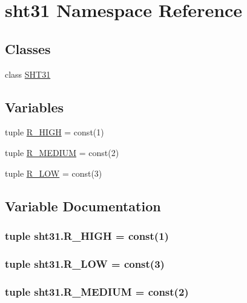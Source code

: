 \hypertarget{namespacesht31}{\section{sht31 Namespace Reference}
\label{namespacesht31}
}
\subsection*{Classes}
\begin{DoxyCompactItemize}
\item 
class \hyperlink{classsht31_1_1SHT31}{S\-H\-T31}
\end{DoxyCompactItemize}
\subsection*{Variables}
\begin{DoxyCompactItemize}
\item 
tuple \hyperlink{namespacesht31_a5f79cfb96d1107f4c885e4451a085307}{R\-\_\-\-H\-I\-G\-H} = const(1)
\item 
tuple \hyperlink{namespacesht31_a39ca7a0c9f2df3e08517f604b719b93e}{R\-\_\-\-M\-E\-D\-I\-U\-M} = const(2)
\item 
tuple \hyperlink{namespacesht31_a2cc4a4c81c072b041ac5a7fdf1a674c9}{R\-\_\-\-L\-O\-W} = const(3)
\end{DoxyCompactItemize}


\subsection{Variable Documentation}
\hypertarget{namespacesht31_a5f79cfb96d1107f4c885e4451a085307}{
\subsubsection[{R\-\_\-\-H\-I\-G\-H}]{\setlength{\rightskip}{0pt plus 5cm}tuple sht31.\-R\-\_\-\-H\-I\-G\-H = const(1)}}\label{namespacesht31_a5f79cfb96d1107f4c885e4451a085307}
\hypertarget{namespacesht31_a2cc4a4c81c072b041ac5a7fdf1a674c9}{
\subsubsection[{R\-\_\-\-L\-O\-W}]{\setlength{\rightskip}{0pt plus 5cm}tuple sht31.\-R\-\_\-\-L\-O\-W = const(3)}}\label{namespacesht31_a2cc4a4c81c072b041ac5a7fdf1a674c9}
\hypertarget{namespacesht31_a39ca7a0c9f2df3e08517f604b719b93e}{
\subsubsection[{R\-\_\-\-M\-E\-D\-I\-U\-M}]{\setlength{\rightskip}{0pt plus 5cm}tuple sht31.\-R\-\_\-\-M\-E\-D\-I\-U\-M = const(2)}}\label{namespacesht31_a39ca7a0c9f2df3e08517f604b719b93e}
